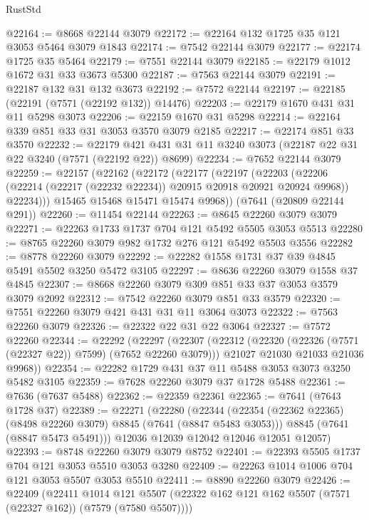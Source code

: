 \begin{lexlean}{RustStd}
\begin{coremodule}
@22164 := @8668 @22144 @3079
@22172 := @22164 @132 @1725 @35 @121 @3053 @5464 @3079 @1843
@22174 := @7542 @22144 @3079
@22177 := @22174 @1725 @35 @5464
@22179 := @7551 @22144 @3079
@22185 := @22179 @1012 @1672 @31 @33 @3673 @5300
@22187 := @7563 @22144 @3079
@22191 := @22187 @132 @31 @132 @3673
@22192 := @7572 @22144
@22197 := @22185 (@22191 (@7571 (@22192 @132)) @14476)
@22203 := @22179 @1670 @431 @31 @11 @5298 @3073
@22206 := @22159 @1670 @31 @5298
@22214 := @22164 @339 @851 @33 @31 @3053 @3570 @3079 @2185
@22217 := @22174 @851 @33 @3570
@22232 := @22179 @421 @431 @31 @11 @3240 @3073 (@22187 @22 @31 @22 @3240 (@7571 (@22192 @22)) @8699)
@22234 := @7652 @22144 @3079
@22259 := @22157
    (@22162
      (@22172
        (@22177
          (@22197
            (@22203
              (@22206 (@22214 (@22217 (@22232 @22234)) @20915 @20918 @20921 @20924 @9968))
              @22234)))
        @15465
        @15468
        @15471
        @15474
        @9968))
    (@7641 (@20809 @22144 @291))
@22260 := @11454 @22144
@22263 := @8645 @22260 @3079 @3079
@22271 := @22263 @1733 @1737 @704 @121 @5492 @5505 @3053 @5513
@22280 := @8765 @22260 @3079 @982 @1732 @276 @121 @5492 @5503 @3556
@22282 := @8778 @22260 @3079
@22292 := @22282 @1558 @1731 @37 @39 @4845 @5491 @5502 @3250 @5472 @3105
@22297 := @8636 @22260 @3079 @1558 @37 @4845
@22307 := @8668 @22260 @3079 @309 @851 @33 @37 @3053 @3579 @3079 @2092
@22312 := @7542 @22260 @3079 @851 @33 @3579
@22320 := @7551 @22260 @3079 @421 @431 @31 @11 @3064 @3073
@22322 := @7563 @22260 @3079
@22326 := @22322 @22 @31 @22 @3064
@22327 := @7572 @22260
@22344 := @22292
    (@22297
      (@22307
        (@22312 (@22320 (@22326 (@7571 (@22327 @22)) @7599) (@7652 @22260 @3079)))
        @21027
        @21030
        @21033
        @21036
        @9968))
@22354 := @22282 @1729 @431 @37 @11 @5488 @3053 @3073 @3250 @5482 @3105
@22359 := @7628 @22260 @3079 @37 @1728 @5488
@22361 := @7636 (@7637 @5488)
@22362 := @22359 @22361
@22365 := @7641 (@7643 @1728 @37)
@22389 := @22271
    (@22280
      (@22344
        (@22354 (@22362 @22365) (@8498 @22260 @3079) @8845 (@7641 (@8847 @5483 @3053)))
        @8845
        (@7641 (@8847 @5473 @5491)))
      @12036
      @12039
      @12042
      @12046
      @12051
      @12057)
@22393 := @8748 @22260 @3079 @3079 @8752
@22401 := @22393 @5505 @1737 @704 @121 @3053 @5510 @3053 @3280
@22409 := @22263 @1014 @1006 @704 @121 @3053 @5507 @3053 @5510
@22411 := @8890 @22260 @3079
@22426 := @22409
    (@22411
      @1014
      @121
      @5507
      (@22322 @162 @121 @162 @5507 (@7571 (@22327 @162)) (@7579 (@7580 @5507))))

\end{coremodule}
\end{lexlean}
